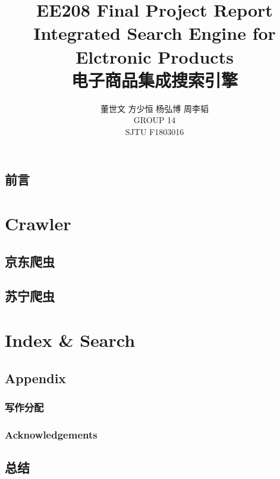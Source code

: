 \documentclass{book}
\begin{document}
\title{EE208 Final Project Report \\ Integrated Search Engine for Elctronic Products \\ 电子商品集成搜索引擎}

\author{董世文 \quad 方少恒 \quad  杨弘博 \quad  周李韬 \\ GROUP 14 \\ SJTU F1803016} %

\maketitle 

\tableofcontents 

\mainmatter %


\frontmatter

\chapter{前言}


\mainmatter


\part{Crawler}

\chapter{京东爬虫}





\chapter{苏宁爬虫}








\part{Index \& Search}



\backmatter

\chapter{Appendix}

\section*{写作分配}

\section*{Acknowledgements}

\chapter{总结}
\end{document}
